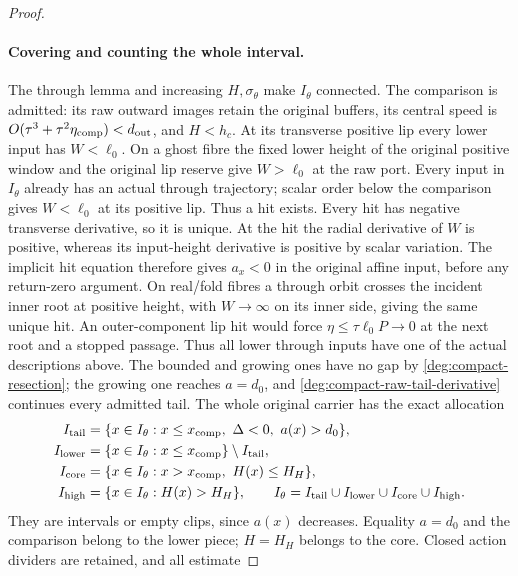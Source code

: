 \begin{proof}
\paragraph{Covering and counting the whole interval.}
The through lemma and increasing \(H,\sigma_\theta\) make
\(I_\theta\) connected. The comparison is admitted: its raw outward
images retain the original buffers, its central speed is
\(O(\tau^3+\tau^2\eta_{\rm comp})<d_{\rm out}\), and \(H<h_c\).
At its transverse positive lip every lower input has \(W<\ell_0\).
On a ghost fibre the fixed lower height of the original positive window
and the original lip reserve give \(W>\ell_0\) at the raw port.
Every input in \(I_\theta\) already has an actual through trajectory;
scalar order below the comparison gives \(W<\ell_0\) at its positive
lip. Thus a hit exists. Every hit has negative transverse derivative,
so it is unique. At the hit the radial derivative of \(W\) is positive,
whereas its input-height derivative is positive by scalar variation.
The implicit hit equation therefore gives \(a_x<0\) in the original
affine input, before any return-zero argument.
On real/fold fibres a through orbit crosses the incident inner root at
positive height, with \(W\to\infty\) on its inner side, giving the
same unique hit. An outer-component lip hit would force
\(\eta\le\tau\ell_0P\to0\) at the next root and a stopped passage.
Thus all lower through inputs have one of the actual descriptions above.
The bounded and growing ones have no gap by
\eqref{deg:compact-resection}; the growing one reaches \(a=d_0\),
and \eqref{deg:compact-raw-tail-derivative} continues every admitted tail.
The whole original carrier has the exact allocation
\begin{equation}\label{deg:compact-physical-cover}
 \begin{split}
 I_{\rm tail}&=\{x\in I_\theta:x\le x_{\rm comp},\ \Delta<0,\ a(x)>d_0\},\\
 I_{\rm lower}&=\{x\in I_\theta:x\le x_{\rm comp}\}\setminus I_{\rm tail},\\
 I_{\rm core}&=\{x\in I_\theta:x>x_{\rm comp},\ H(x)\le H_H\},\\
 I_{\rm high}&=\{x\in I_\theta:H(x)>H_H\},\qquad
 I_\theta=I_{\rm tail}\cup I_{\rm lower}\cup I_{\rm core}\cup I_{\rm high}.
 \end{split}
\end{equation}
They are intervals or empty clips, since \(a(x)\) decreases. Equality
\(a=d_0\) and the comparison belong to the lower piece; \(H=H_H\)
belongs to the core. Closed action dividers are retained, and all estimate

\end{proof}
